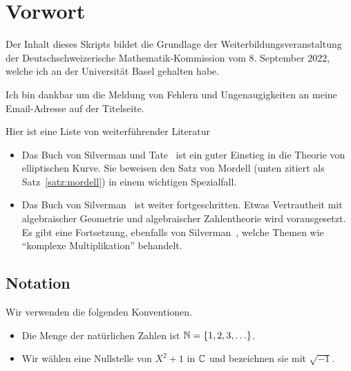 \chapter{Vorwort}

Der Inhalt dieses Skripts bildet die Grundlage der
Weiterbildungsveranstaltung der Deutschschweizerische
Mathematik-Kommission vom 8. September 2022, welche ich an der
Universität Basel gehalten habe.

Ich bin dankbar um die Meldung von Fehlern und Ungenaugigkeiten an
meine Email-Adresse auf der Titelseite.

Hier ist eine Liste von weiterführender Literatur
\begin{itemize}
\item Das Buch von Silverman und Tate~\cite{SilvermanTate}
  ist ein guter Einstieg in die Theorie von
  elliptischen Kurve.  Sie beweisen den Satz von Mordell (unten zitiert
  als Satz~\ref{satz:mordell}) in einem wichtigen Spezialfall.
\item Das Buch von Silverman~\cite{Silverman:AEC} ist weiter
  fortgeschritten. Etwas Vertrautheit mit  algebraischer Geometrie
  und  algebraischer Zahlentheorie wird vorausgesetzt. Es gibt eine
  Fortsetzung, ebenfalls von Silverman~\cite{Silverman:Adv}, welche
  Themen wie ``komplexe Multiplikation'' behandelt. 
\end{itemize}

\section{Notation}

Wir verwenden die folgenden Konventionen.

\begin{itemize}
\item Die Menge der natürlichen Zahlen ist ${\mathbb{N}} = \{1,2,3,\ldots\}$.

\item Wir wählen eine Nullstelle von $X^2+1$ in ${\mathbb{C}}$ und bezeichnen sie
  mit $\sqrt{-1}$.
  
\end{itemize}

